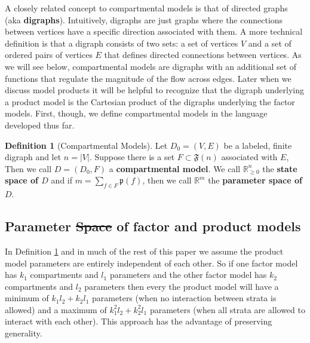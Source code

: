 \documentclass[pdflatex,sn-basic]{sn-jnl}%
\theoremstyle{definition}
\newtheorem{definition}{Definition}
\newcommand{\R}{\mathbb{R}}%
\newcommand{\Rnn}{\mathbb{R}_{\ge 0}}%
\newcommand{\abs}[1]{\lvert #1 \rvert}%
\newcommand{\flowfunc}[1]{\mathfrak{F}(#1)}%
\newcommand{\pardim}[1]{\mathfrak{p}(#1)}%
\providecommand{\DIFadd}[1]{{\protect\color{blue}\uwave{#1}}} %
\providecommand{\DIFdel}[1]{{\protect\color{red}\sout{#1}}}                      %
\providecommand{\DIFaddbegin}{} %
\providecommand{\DIFaddend}{} %
\providecommand{\DIFdelbegin}{} %
\providecommand{\DIFdelend}{} %
\newcommand{\DIFscaledelfig}{0.5}
\newlength{\DIFdelgraphicswidth} %
\newlength{\DIFdelgraphicsheight} %
\newcommand{\DIFaddincludegraphics}[2][]{{\color{blue}\fbox{\DIFOincludegraphics[#1]{#2}}}} %
\newcommand{\DIFdelincludegraphics}[2][]{%
\sbox{\DIFdelgraphicsbox}{\DIFOincludegraphics[#1]{#2}}%
\settoboxwidth{\DIFdelgraphicswidth}{\DIFdelgraphicsbox} %
\settoboxtotalheight{\DIFdelgraphicsheight}{\DIFdelgraphicsbox} %
\scalebox{\DIFscaledelfig}{%
\parbox[b]{\DIFdelgraphicswidth}{\usebox{\DIFdelgraphicsbox}\\[-\baselineskip] \rule{\DIFdelgraphicswidth}{0em}}\llap{\resizebox{\DIFdelgraphicswidth}{\DIFdelgraphicsheight}{%
\setlength{\unitlength}{\DIFdelgraphicswidth}%
\begin{picture}(1,1)%
\thicklines\linethickness{2pt} %
{\color[rgb]{1,0,0}\put(0,0){\framebox(1,1){}}}%
{\color[rgb]{1,0,0}\put(0,0){\line( 1,1){1}}}%
{\color[rgb]{1,0,0}\put(0,1){\line(1,-1){1}}}%
\end{picture}%
}\hspace*{3pt}}} %
} %
\DeclareRobustCommand{\DIFaddbegin}{\DIFOaddbegin \let\includegraphics\DIFaddincludegraphics} %
\DeclareRobustCommand{\DIFaddend}{\DIFOaddend \let\includegraphics\DIFOincludegraphics} %
\DeclareRobustCommand{\DIFdelbegin}{\DIFOdelbegin \let\includegraphics\DIFdelincludegraphics} %
\DeclareRobustCommand{\DIFdelend}{\DIFOaddend \let\includegraphics\DIFOincludegraphics} %
\begin{document}
A closely related concept to compartmental models is that of directed graphs (aka \textbf{digraphs}). Intuitively, digraphs are just graphs where the connections between vertices have a specific direction associated with them. A more technical definition is that a digraph consists of two sets: a set of vertices $V$ and a set of ordered pairs of vertices $E$ that defines directed connections between vertices. As we will see below, compartmental models are digraphs with an additional set of functions that regulate the magnitude of the flow across edges. Later when we discuss model products it will be helpful to recognize that the digraph underlying a product model is the Cartesian product of the digraphs underlying the factor models. First, though, we define compartmental models in the language developed thus far.

\begin{definition}[Compartmental Models]\label{compmodel}
    Let $D_0=(V,E)$ be a labeled, finite digraph and let $n=\abs{V}$. Suppose there is a set $F\subset\flowfunc{n}$ associated with $E$, Then we call $D=(D_0, F)$ a \textbf{compartmental model}. We call $\Rnn^n$ the \textbf{state space of $D$} and if $m=\sum\limits_{f\in F}\pardim{f}$, then we call $\R^m$ the \textbf{parameter space of $D$}.
\end{definition}


\subsection{Parameter \DIFdelbegin \DIFdel{Space }\DIFdelend \DIFaddbegin \DIFadd{space }\DIFaddend of factor and product models}
In Definition \ref{compmodel} and in much of the rest of this paper we assume the product model parameters are entirely independent of each other. So if one factor model has $k_1$ compartments and $l_1$ parameters and the other factor model has $k_2$ compartments and $l_2$ parameters then every the product model will have a minimum of $k_1l_2+k_2l_1$ parameters (when no interaction between strata is allowed) and a maximum of $k_1^2l_2+k_2^2l_1$ parameters (when all strata are allowed to interact with each other).  This approach has the advantage of preserving generality. 
\end{document}
